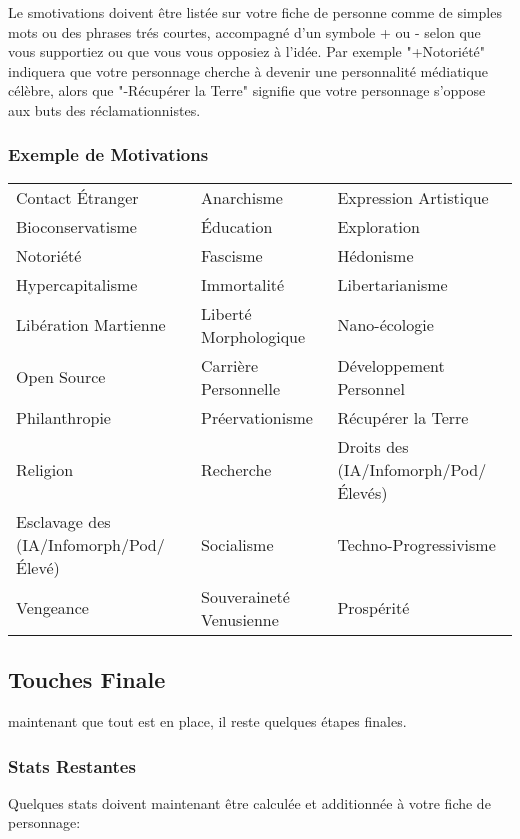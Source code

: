 Le smotivations doivent être listée sur votre fiche de personne comme de simples mots ou des phrases trés courtes, accompagné d'un symbole + ou - selon que vous supportiez ou que vous vous opposiez à l'idée. Par exemple "+Notoriété" indiquera que votre personnage cherche à devenir une personnalité médiatique célèbre, alors que "-Récupérer la Terre" signifie que votre personnage s'oppose aux buts des réclamationnistes. 

\subsubsection{Exemple de Motivations} \label{sec:example-motivations} 

\begin{tabular}{lll} Contact Étranger &Anarchisme &Expression Artistique\\ Bioconservatisme &Éducation &Exploration \\ Notoriété &Fascisme &Hédonisme \\ Hypercapitalisme &Immortalité &Libertarianisme \\ Libération Martienne &Liberté Morphologique &Nano-écologie \\ Open Source &Carrière Personnelle &Développement Personnel\\ Philanthropie &Préervationisme &Récupérer la Terre\\ Religion &Recherche &Droits des (IA/Infomorph/Pod/Élevés)\\ Esclavage des (IA/Infomorph/Pod/Élevé) &Socialisme &Techno-Progressivisme \\ Vengeance &Souveraineté Venusienne &Prospérité\\ \end{tabular} 

\subsection{Touches Finale} \label{sec:final-touches} 

maintenant que tout est en place, il reste quelques étapes finales. 

\subsubsection{Stats Restantes} \label{sec:remaining-stats} 

Quelques stats doivent maintenant être calculée et additionnée à votre fiche de personnage: 

